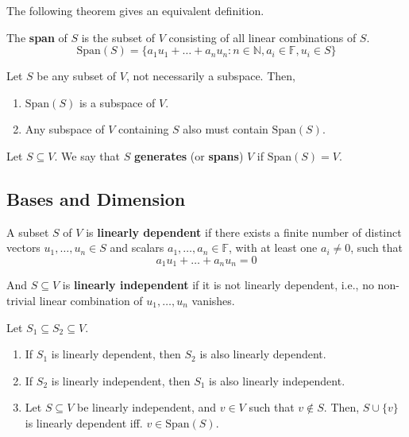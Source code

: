 The following theorem gives an equivalent definition.

\begin{theorem}
	The \textbf{span} of $S$ is the subset of $V$ consisting of all linear combinations of $S$.
	\[
		\text{Span}(S) = \{ a_1 u_1 + \ldots + a_n u_n : n \in \mathbb{N}, a_i \in \mathbb{F}, u_i \in S \}
	\]
\end{theorem}

\begin{theorem}
	Let $S$ be any subset of $V$, not necessarily a subspace. Then,
	\begin{enumerate}
		\item $\text{Span}(S)$ is a subspace of $V$.
		\item Any subspace of $V$ containing $S$ also must contain $\text{Span}(S)$.
	\end{enumerate}
\end{theorem}

\begin{definition}
	Let $S \subseteq V$. We say that $S$ \textbf{generates} (or \textbf{spans}) $V$ if $\text{Span}(S) = V$.
\end{definition}

\subsection{Bases and Dimension}

\begin{definition}
	A subset $S$ of $V$ is \textbf{linearly dependent} if there exists a finite number of distinct vectors $u_1, \ldots, u_n \in S$ and scalars $a_1, \ldots, a_n \in \mathbb{F}$, with at least one $a_i \neq 0$, such that 
	\[
		a_1 u_1 + \ldots + a_n u_n = 0
	\]

	And $S \subseteq V$ is \textbf{linearly independent} if it is not linearly dependent, i.e., no non-trivial linear combination of $u_1, \ldots, u_n$ vanishes.
\end{definition}

\begin{theorem}
	Let $S_1 \subseteq S_2 \subseteq V$. 
	\begin{enumerate}
		\item If $S_1$ is linearly dependent, then $S_2$ is also linearly dependent. 
		\item If $S_2$ is linearly independent, then $S_1$ is also linearly independent. 
		\item Let $S \subseteq V$ be linearly independent, and $v \in V$ such that $v \not\in S$. Then, $S \cup \{ v \}$ is linearly dependent iff. $v \in \text{Span}(S)$.
	\end{enumerate}
\end{theorem}

